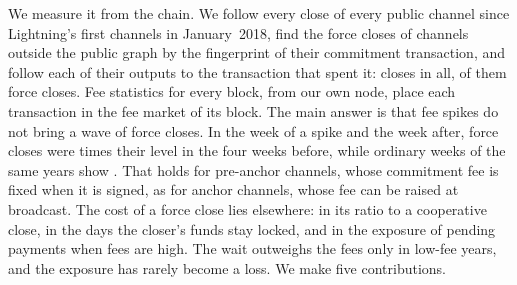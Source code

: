We measure it from the chain.
We follow every close of every public channel since Lightning's first channels in January~2018, find the force
closes of channels outside the public graph by the fingerprint of their commitment transaction, and follow each of
their \NOutputs{} outputs to the transaction that spent it: \NClosesAll{} closes in all, \NForceAll{} of them force
closes. Fee statistics for every block, from our own node, place each transaction in the fee market of its block.
The main answer is that fee spikes do not bring a wave of force closes. In the week of a spike and the week after,
force closes were \PlEvAllNow{} times their level in the four weeks before, while ordinary weeks of the same years
show \PlEvAllNowMed. That holds for pre-anchor channels, whose commitment fee is fixed when it is signed, as for anchor
channels, whose fee can be raised at broadcast. The cost of a force close lies elsewhere: in its ratio to a cooperative close, in
the days the closer's funds stay locked, and in the exposure of pending payments when fees are high. The wait
outweighs the fees only in low-fee years, and the exposure has rarely become a loss. We make five contributions.

